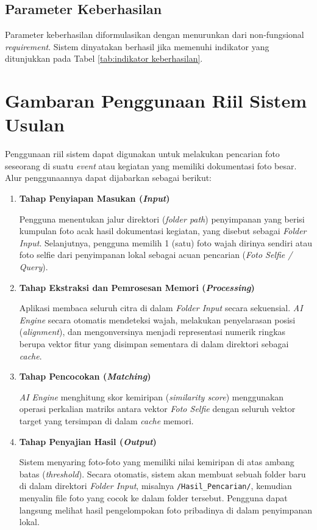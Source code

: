 \subsection{Parameter Keberhasilan}

Parameter keberhasilan diformulasikan dengan menurunkan dari non-fungsional \textit{requirement}. Sistem dinyatakan berhasil jika memenuhi indikator yang ditunjukkan pada Tabel \ref{tab:indikator keberhasilan}.




\section{Gambaran Penggunaan Riil Sistem Usulan}

Penggunaan riil sistem dapat digunakan untuk melakukan pencarian foto seseorang di suatu \textit{event} atau kegiatan yang memiliki dokumentasi foto besar. Alur penggunaannya dapat dijabarkan sebagai berikut:

\begin{enumerate}
    \item \textbf{Tahap Penyiapan Masukan (\textit{Input})}

    Pengguna menentukan jalur direktori (\textit{folder path}) penyimpanan yang berisi kumpulan foto acak hasil dokumentasi kegiatan, yang disebut sebagai \textit{Folder Input}. Selanjutnya, pengguna memilih 1 (satu) foto wajah dirinya sendiri atau foto selfie dari penyimpanan lokal sebagai acuan pencarian (\textit{Foto Selfie / Query}).

    \item \textbf{Tahap Ekstraksi dan Pemrosesan Memori (\textit{Processing})}

    Aplikasi membaca seluruh citra di dalam \textit{Folder Input} secara sekuensial. \textit{AI Engine} secara otomatis mendeteksi wajah, melakukan penyelarasan posisi (\textit{alignment}), dan mengonversinya menjadi representasi numerik ringkas berupa vektor fitur yang disimpan sementara di dalam direktori sebagai \textit{cache}.

    \item \textbf{Tahap Pencocokan (\textit{Matching})}

    \textit{AI Engine} menghitung skor kemiripan (\textit{similarity score}) menggunakan operasi perkalian matriks antara vektor \textit{Foto Selfie} dengan seluruh vektor target yang tersimpan di dalam \textit{cache} memori.

    \item \textbf{Tahap Penyajian Hasil (\textit{Output})}

    Sistem menyaring foto-foto yang memiliki nilai kemiripan di atas ambang batas (\textit{threshold}). Secara otomatis, sistem akan membuat sebuah folder baru di dalam direktori \textit{Folder Input}, misalnya \texttt{/Hasil\_Pencarian/}, kemudian menyalin file foto yang cocok ke dalam folder tersebut. Pengguna dapat langsung melihat hasil pengelompokan foto pribadinya di dalam penyimpanan lokal.
\end{enumerate}